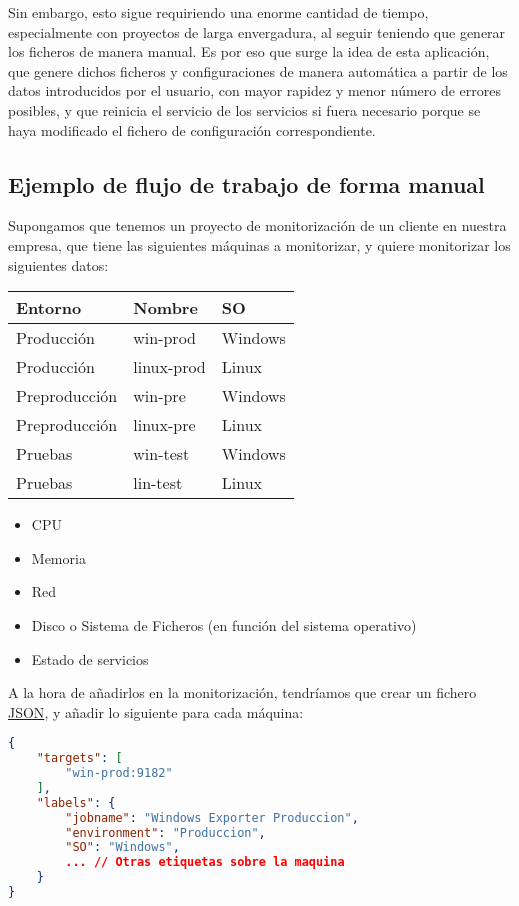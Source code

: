 Sin embargo, esto sigue requiriendo una enorme cantidad de tiempo, especialmente con proyectos de larga envergadura, al seguir teniendo que generar los ficheros de manera manual. Es por eso que surge la idea de esta aplicación, que genere dichos ficheros y configuraciones de manera automática a partir de los datos introducidos por el usuario, con mayor rapidez y menor número de errores posibles, y que reinicia el servicio de los servicios si fuera necesario porque se haya modificado el fichero de configuración correspondiente.

\subsection*{Ejemplo de flujo de trabajo de forma manual}
\label{sec:flujo_manual}

Supongamos que tenemos un proyecto de monitorización de un cliente en nuestra empresa, que tiene las siguientes máquinas a monitorizar, y quiere monitorizar los siguientes datos:

\begin{multicols}{2}
\begin{tabular}[h]{l|l|l}
    \textbf{Entorno} & \textbf{Nombre} & \textbf{SO} \\
    \hline
    \hline
    Producción & win-prod & Windows \\
    \hline
    Producción & linux-prod & Linux \\
    \hline
    Preproducción & win-pre & Windows \\
    \hline
    Preproducción & linux-pre & Linux \\
    \hline
    Pruebas & win-test & Windows \\
    \hline
    Pruebas & lin-test & Linux \\
\end{tabular}
\columnbreak   
\begin{itemize}
    \item CPU
    \item Memoria
    \item Red
    \item Disco o Sistema de Ficheros (en función del sistema operativo)
    \item Estado de servicios
\end{itemize}
\end{multicols}

A la hora de añadirlos en la monitorización, tendríamos que crear un fichero \url{JSON}, y añadir lo siguiente para cada máquina:
\begin{lstlisting}[language=json]
{
    "targets": [
        "win-prod:9182"
    ],
    "labels": {
        "jobname": "Windows Exporter Produccion",
        "environment": "Produccion",
        "SO": "Windows",
        ... // Otras etiquetas sobre la maquina
    }
}
\end{lstlisting}

